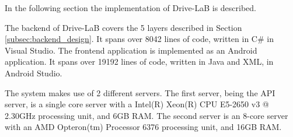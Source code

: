 In the following section the implementation of Drive-LaB is described.

The backend of Drive-LaB covers the 5 layers described in Section \ref{subsec:backend_design}. It spans over 8042 lines of code, written in C\# in Visual Studio. The frontend application is implemented as an Android application. It spans over 19192 lines of code, written in Java and XML, in Android Studio.

The system  makes use of 2 different servers. The first server, being the API server, is a single core server with a Intel(R) Xeon(R) CPU E5-2650 v3 @ 2.30GHz processing unit, and 6GB RAM. The second server is an 8-core server with an AMD Opteron(tm) Processor 6376 processing unit, and 16GB RAM.